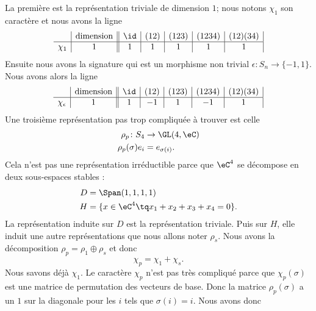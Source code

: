 La première est la représentation triviale de dimension \( 1\); nous notons \( \chi_1\) son caractère et nous avons la ligne
\begin{equation}
    \begin{array}[]{c|c||c|c|c|c|c|}
        &\text{dimension}&\id&(12)&(123)&(1234)&(12)(34)\\
          \hline
          \chi_1&1&1&1&1&1&1\\ 
    \end{array}
\end{equation}
Ensuite nous avons la signature qui est un morphisme non trivial \( \epsilon\colon S_n\to \{ -1,1 \}\). Nous avons alors la ligne
\begin{equation}    \label{EqGNRavtl}
    \begin{array}[]{c|c||c|c|c|c|c|}
        &\text{dimension}&\id&(12)&(123)&(1234)&(12)(34)\\
          \hline
          \chi_{\epsilon}&1&1&-1&1&-1&1\\ 
    \end{array}
\end{equation}
Une troisième représentation pas trop compliquée à trouver est celle 
\begin{equation}
    \begin{aligned}
        \rho_p\colon S_4&\to \GL(4,\eC) \\
        \rho_p(\sigma)e_i&=e_{\sigma(i)}. 
    \end{aligned}
\end{equation}
Cela n'est pas une représentation irréductible parce que \( \eC^4\) se décompose en deux sous-espaces stables :
\begin{subequations}
    \begin{align}
        D&=\Span(1,1,1,1)\\
        H&=\{ x\in\eC^4\tq x_1+x_2+x_3+x_4=0 \}.
    \end{align}
\end{subequations}
La représentation induite sur \( D\) est la représentation triviale. Puis sur \( H\), elle induit une autre représentations que nous allons noter \( \rho_s\). Nous avons la décomposition \( \rho_p=\rho_1\oplus \rho_s\) et donc
\begin{equation}
    \chi_p=\chi_1+\chi_s.
\end{equation}
Nous savons déjà \( \chi_1\). Le caractère \( \chi_p\) n'est pas très compliqué parce que \( \chi_p(\sigma)\) est une matrice de permutation des vecteurs de base. Donc la matrice \( \rho_p(\sigma)\) a un \( 1 \) sur la diagonale pour les \( i\) tels que \( \sigma(i)=i\). Nous avons donc
